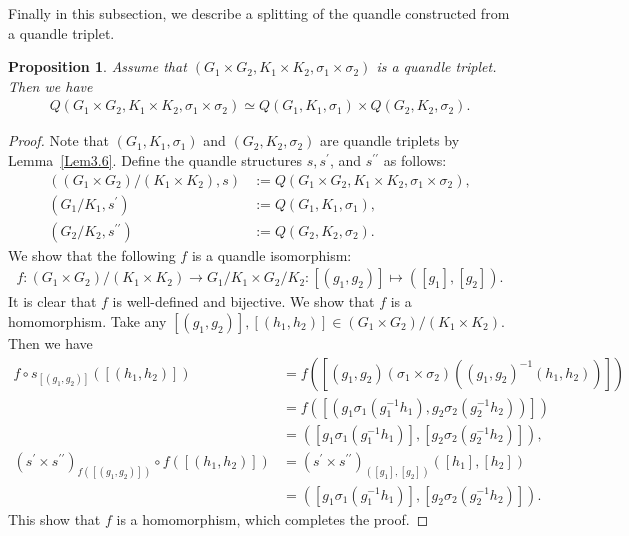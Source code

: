 \documentclass[12pt]{amsart}
\newtheorem{Prop}{Proposition}[section]
\theoremstyle{definition}
\begin{document}
Finally in this subsection, we describe a splitting of the quandle constructed from a quandle triplet.

\begin{Prop}\label{Prop3.7}
Assume that $ (G_{1} \times G_{2}, K_{1} \times K_{2}, \sigma_{1} \times \sigma_{2}) $ is a quandle triplet. Then we have
\begin{align*}
Q(G_{1} \times G_{2}, K_{1} \times K_{2}, \sigma_{1} \times \sigma_{2}) \simeq Q(G_{1},K_{1},\sigma_{1}) \times Q(G_{2},K_{2},\sigma_{2}).
\end{align*}
\end{Prop}

\begin{proof}
Note that $ (G_{1},K_{1},\sigma_{1}) $ and $ (G_{2},K_{2},\sigma_{2}) $ are quandle triplets by Lemma~\ref{Lem3.6}. Define the quandle structures $ s, s^{\prime} $, and $ s^{\prime\prime} $ as follows:
\begin{align*}
((G_{1} \times G_{2})/(K_{1} \times K_{2}),s) &:= Q(G_{1} \times G_{2}, K_{1} \times K_{2}, \sigma_{1} \times \sigma_{2}),\\
(G_{1}/K_{1},s^{\prime}) &:= Q(G_{1},K_{1},\sigma_{1}),\\
(G_{2}/K_{2},s^{\prime\prime}) &:= Q(G_{2},K_{2},\sigma_{2}).
\end{align*}
We show that the following $ f $ is a quandle isomorphism:
\begin{align*}
f: (G_{1} \times G_{2})/(K_{1} \times K_{2}) \rightarrow G_{1}/K_{1} \times G_{2}/K_{2} : [(g_{1}, g_{2})] \mapsto ([g_{1}], [g_{2}]).
\end{align*}
It is clear that $ f $ is well-defined and bijective. We show that $ f $ is a homomorphism. Take any $ [(g_{1},g_{2})], [(h_{1},h_{2})] \in (G_{1} \times G_{2})/(K_{1} \times K_{2}) $. Then we have
\begin{align*}
f \circ s_{[(g_{1},g_{2})]}([(h_{1},h_{2})]) &= f ([(g_{1},g_{2}) (\sigma_{1} \times \sigma_{2}) ((g_{1},g_{2})^{-1}(h_{1},h_{2}))])\\ 
&= f([(g_{1}\sigma_{1}(g^{-1}_{1}h_{1}), g_{2}\sigma_{2}(g^{-1}_{2}h_{2}))])\\
&= ([g_{1}\sigma_{1}(g^{-1}_{1}h_{1})], [g_{2}\sigma_{2}(g^{-1}_{2}h_{2})]),\\
(s^{\prime} \times s^{\prime\prime})_{f([(g_{1},g_{2})])} \circ f([(h_{1},h_{2})]) &=  (s^{\prime} \times s^{\prime\prime})_{([g_{1}],[g_{2}])} ([h_{1}],[h_{2}])\\
&= ([g_{1}\sigma_{1}(g^{-1}_{1}h_{1})], [g_{2}\sigma_{2}(g^{-1}_{2}h_{2})]).
\end{align*}
This show that $ f $ is a homomorphism, which completes the proof.
\end{proof}
\end{document}
